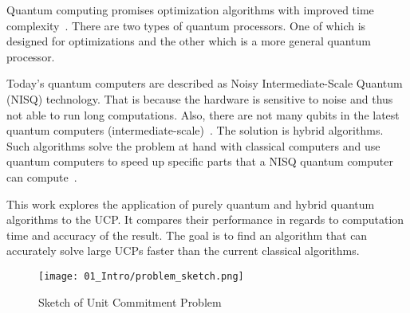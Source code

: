 Quantum computing promises optimization algorithms with improved time complexity~\cite{Portnov2000, Ahuja1999, Gilliam2019, Ajagekar2020, Shaydulin2019}.
There are two types of quantum processors.
One of which is designed for optimizations and the other which is a more general quantum processor.

Today's quantum computers are described as Noisy Intermediate-Scale Quantum (NISQ) technology.
That is because the hardware is sensitive to noise and thus not able to run long computations.
Also, there are not many qubits in the latest quantum computers (intermediate-scale)~\cite{Leymann2020}.
The solution is hybrid algorithms.
Such algorithms solve the problem at hand with classical computers and use quantum computers to speed up specific parts that a NISQ quantum computer can compute~\cite{Ajagekar2020, Shaydulin2019}.

This work explores the application of purely quantum and hybrid quantum algorithms to the UCP.
It compares their performance in regards to computation time and accuracy of the result.
The goal is to find an algorithm that can accurately solve large UCPs faster than the current classical algorithms.

\begin{figure}[!ht]
  \centering
  \texttt{[image: 01\_Intro/problem\_sketch.png]}
  \caption{Sketch of Unit Commitment Problem}
  \label{figure:problem.sketch}
\end{figure}
